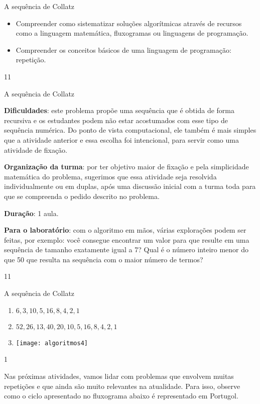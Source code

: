 \begin{objectives}{A sequência de Collatz}
{
\begin{itemize}
\item Compreender como sistematizar soluções algorítmicas através de recursos como a linguagem matemática, fluxogramas ou linguagens de programação.

\item Compreender os conceitos básicos de uma linguagem de programação: repetição.
\end{itemize}
}{1}{1}
\end{objectives}
\marginpar{\vspace{-2.5em}}
\begin{sugestions}{A sequência de Collatz}
{
\textbf{Dificuldades}: este problema propõe uma sequência que é obtida de forma recursiva e os estudantes podem não estar acostumados com esse tipo de sequência numérica. Do ponto de vista computacional, ele também é mais simples que a atividade anterior e essa escolha foi intencional, para servir como uma atividade de fixação.

\textbf{Organização da turma}: por ter objetivo maior de fixação e pela simplicidade matemática do problema, sugerimos que essa atividade seja resolvida individualmente ou em duplas, após uma discussão inicial com a turma toda para que se compreenda o pedido descrito no problema.

\textbf{Duração}: 1 aula.

\textbf{Para o laboratório}: com o algoritmo em mãos, várias explorações podem ser feitas, por exemplo: você consegue encontrar um valor para  que resulte em uma sequência de tamanho exatamente igual a 7? Qual é o número inteiro menor do que 50 que resulta na sequência com o maior número de termos?
}{1}{1}
\end{sugestions}
\marginpar{\vspace{-1em}}
\begin{answer}{A sequência de Collatz}
{
\begin{enumerate}
\item $6, 3, 10, 5, 16, 8, 4, 2, 1$
\item $52, 26, 13, 40, 20, 10, 5, 16, 8, 4, 2, 1$
\item {}
{
\texttt{[image: algoritmos4]}
}
\end{enumerate}
}{1}
\end{answer}


Nas próximas atividades, vamos lidar com problemas que envolvem muitas repetições e que ainda são muito relevantes na atualidade. Para isso, observe como o ciclo apresentado no fluxograma abaixo é representado em Portugol.

